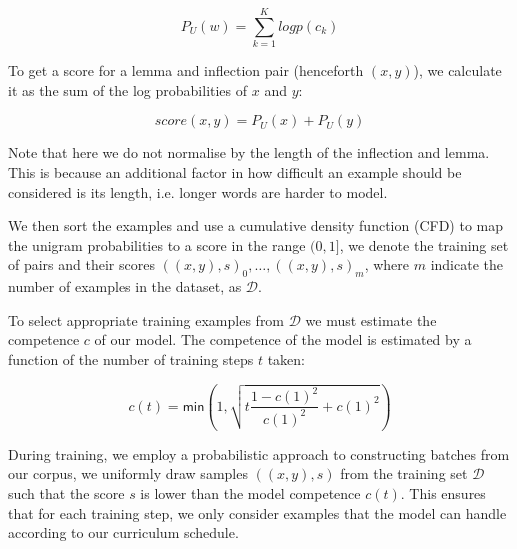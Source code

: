\documentclass[11pt,a4paper]{article}
\begin{document}
\begin{equation}
    P_U(w) = \sum_{k=1}^{K} logp(c_k)
\end{equation}

To get a score for a lemma and inflection pair (henceforth $(x,y)$),
we calculate it as the sum of the log probabilities of $x$ and $y$:

\begin{equation}
    score(x,y) = P_U(x) + P_U(y)
\end{equation}

Note that here we do not normalise by the length of the inflection and
lemma. This is because an additional factor in how difficult an
example should be considered is its length, i.e. longer words are
harder to model.

We then sort the examples and use a cumulative density function (CFD)
to map the unigram probabilities to a score in the range $(0, 1]$, we
denote the training set of pairs and their scores
$((x,y), s)_0, \ldots, ((x,y), s)_m$, where $m$ indicate the number of
examples in the dataset, as $\mathcal{D}$.

% 
%
To select appropriate training examples from $\mathcal{D}$ we must
estimate the competence $c$ of our model. The competence of the model
is estimated by a function of the number of training steps $t$ taken:



\begin{equation}
    c(t) = \mathsf{min}(1, \sqrt{t\frac{1-c(1)^2}{c(1)^2}+c(1)^2})
\end{equation}

During training, we employ a probabilistic approach to constructing
batches from our corpus, we uniformly draw samples $((x, y), s)$ from
the training set $\mathcal{D}$ such that the score $s$ is lower than
the model competence $c(t)$. This ensures that for each training
step, we only consider examples that the model can handle according
to our curriculum schedule.
\end{document}
